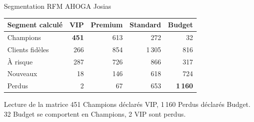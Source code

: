 \documentclass[aspectratio=169,11pt]{beamer}
\newcommand{\legende}[1]{{\color{gris}\footnotesize #1}}
\begin{document}
\begin{frame}{Segmentation RFM}
  \legende{AHOGA Josias}

  \vspace{3mm}
  \begin{center}
  \small
  \begin{tabular}{@{}l r r r r@{}}
    \toprule
    \textbf{Segment calculé} & \textbf{VIP} & \textbf{Premium} & \textbf{Standard} & \textbf{Budget} \\
    \midrule
    Champions       & \textcolor{vert}{\textbf{451}} & 613 & 272 & 32 \\
    Clients fidèles & 266 & 854 & 1\,305 & 816 \\
    À risque        & 287 & 726 & 866 & 317 \\
    Nouveaux        &  18 & 146 & 618 & 724 \\
    Perdus          &   2 &  67 & 653 & \textcolor{rouge}{\textbf{1\,160}} \\
    \bottomrule
  \end{tabular}
  \end{center}

  \vspace{4mm}
  \begin{block}{Lecture de la matrice}
    451 Champions déclarés VIP, 1\,160 Perdus déclarés Budget.
    32 Budget se comportent en Champions, 2 VIP sont perdus.
  \end{block}

\end{frame}
\end{document}
